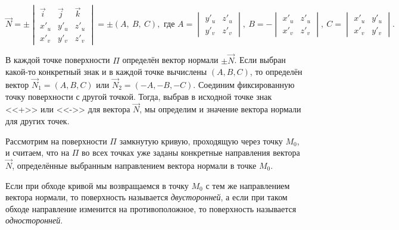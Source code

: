 \documentclass[../../main.tex]{subfiles}
\begin{document}
\[
\vec{N} = 
\pm \begin{vmatrix}
\vec{i} & \vec{j} & \vec{k} \\
x'_u & y'_u & z'_u \\
x'_v & y'_v & z'_v
\end{vmatrix} = 
\pm (A,\ B,\ C)
, \text{ где } A = \begin{vmatrix}
y'_u & z'_u \\
 y'_v & z'_v
\end{vmatrix},\ 
B = -\begin{vmatrix}
x'_u & z'_u \\
x'_v & z'_v
\end{vmatrix},\
C = \begin{vmatrix}
x'_u & y'_u \\
x'_v & y'_v
\end{vmatrix}
.\]

В каждой точке поверхности $\Pi$ определён вектор нормали $\pm \vec{N}$.
Если выбран какой-то конкретный знак и в каждой точке вычислены
$(A, B, C)$, то определён вектор $\vec{N}_1 = (A, B, C)$ или
$\vec{N}_2 = (-A, -B, -C)$.
Соединим фиксированную точку поверхности с другой точкой.
Тогда, выбрав в исходной точке знак <<+>> или <<->> для вектора $\vec{N}$,
мы определим и значение вектора нормали для других точек.

Рассмотрим на поверхности $\Pi$ замкнутую кривую, 
проходящую через точку $M_0$, и
считаем, что на $\Pi$ во всех точках уже заданы конкретные направления
вектора $\vec{N}$, определённые выбранным направлением вектора нормали в точке 
$M_0$. 

Если при обходе кривой мы возвращаемся в точку $M_0$ с тем же
направлением вектора нормали, то поверхность называется \emph{двусторонней},
а если при таком обходе направление изменится на противоположное,
то поверхность называется \emph{односторонней}.
\end{document}
